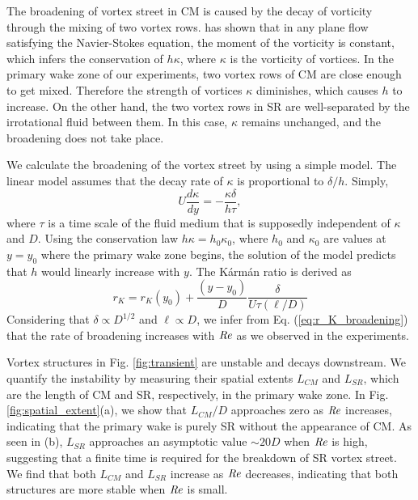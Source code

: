 \documentclass[english, aps, prl, longbibliography, preprint]{revtex4-1}
\newcommand\citebyname\citet
\newcommand\Reynolds{{\it Re}}
\begin{document}
The broadening of vortex street in CM is caused by the decay of vorticity through the mixing of two vortex rows.
\citebyname{Birkhoff1953} has shown that in any plane flow satisfying the Navier-Stokes equation, the moment of the vorticity is constant,
which infers the conservation of $h\kappa$, where $\kappa$ is the vorticity of vortices.
In the primary wake zone of our experiments, two vortex rows of CM are close enough to get mixed.
Therefore the strength of vortices $\kappa$ diminishes, which causes $h$ to increase.
On the other hand, the two vortex rows in SR are well-separated by the irrotational fluid between them.
In this case, $\kappa$ remains unchanged, and the broadening does not take place.

We calculate the broadening of the vortex street by using a simple model.
The linear model assumes that the decay rate of $\kappa$ is proportional to $\delta/h$.
Simply,
\begin{equation}
U\frac{d\kappa}{dy}=-\frac{\kappa\delta}{h\tau},
\end{equation}
where $\tau$ is a time scale of the fluid medium that is supposedly independent of $\kappa$ and $D$.
Using the conservation law $h\kappa=h_0\kappa_0$, where $h_0$ and $\kappa_0$ are values at $y=y_0$ where the primary wake zone begins, the solution of the model predicts that $h$ would linearly increase with $y$.
The K\'{a}rm\'{a}n ratio is derived as
\begin{equation}
r_K=r_K(y_0)+\frac{(y-y_0)}{D}\frac{\delta }{U\tau(\ell/ D)}
\label{eq:r_K_broadening}
\end{equation}
Considering that $\delta\propto D^{1/2}$ and $\ell\propto D$, we infer from Eq. (\ref{eq:r_K_broadening}) that the rate of broadening increases with $\Reynolds$ as we observed in the experiments.

Vortex structures in Fig. \ref{fig:transient} are unstable and decays downstream.
We quantify the instability by measuring their spatial extents $L_{CM}$ and $L_{SR}$, which are the length of CM and SR, respectively, in the primary wake zone.
In Fig. \ref{fig:spatial_extent}(a), we show that $L_{CM}/D$ approaches zero as $\Reynolds$ increases, indicating that the primary wake is purely SR without the appearance of CM.
As seen in (b), $L_{SR}$ approaches an asymptotic value $\sim 20D$ when $\Reynolds$ is high, suggesting that a finite time is required for the breakdown of SR vortex street.
We find that both $L_{CM}$ and $L_{SR}$ increase as $\Reynolds$ decreases, indicating that both structures are more stable when $\Reynolds$ is small.
\end{document}
